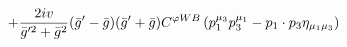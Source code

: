 %
\begin{dmath*}
%
  +  \frac{2 i v}{{\bar g}^{\prime 2} + {\bar g}{}^2}({\bar g}^\prime - {\bar g}{}) ({\bar g}^\prime + {\bar g}{}) C^{ \varphi  WB} \left(p_1^{\mu_3} p_3^{\mu_1} - p_{1}\nobreak\cdot\nobreak{}p_{3} \eta_{\mu_1 \mu_3}\right)
%
\end{dmath*}
%
